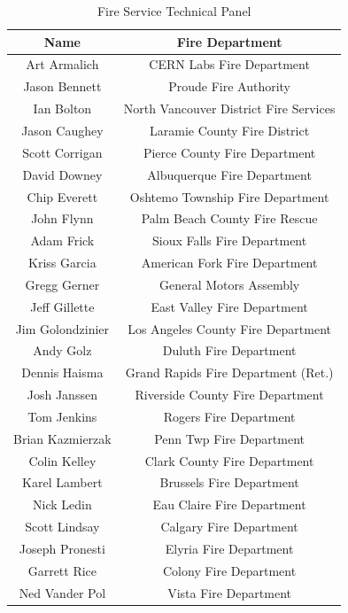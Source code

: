 \documentclass{article}
\begin{document}
\renewcommand{\arraystretch}{1.5}

\begin{table}[H]
	\centering
	\caption{Fire Service Technical Panel}
	\begin{tabular}{|c|c|}
		\hline
		\bf{Name} & \bf{Fire Department} \\ \hline \hline
		Art Armalich & CERN Labs Fire Department \\ \hline
		Jason Bennett & Proude Fire Authority \\ \hline
		Ian Bolton & North Vancouver District Fire Services \\ \hline
		Jason Caughey & Laramie County Fire District \\ \hline
		Scott Corrigan & Pierce County Fire Department \\ \hline
		David Downey & Albuquerque Fire Department \\ \hline
		Chip Everett & Oshtemo Township Fire Department \\ \hline
		John Flynn & Palm Beach County Fire Rescue \\ \hline
		Adam Frick & Sioux Falls Fire Department \\ \hline
		Kriss Garcia & American Fork Fire Department \\ \hline
		Gregg Gerner & General Motors Assembly \\ \hline
		Jeff Gillette & East Valley Fire Department \\ \hline
		Jim Golondzinier & Los Angeles County Fire Department \\ \hline
		Andy Golz & Duluth Fire Department \\ \hline
		Dennis Haisma & Grand Rapids Fire Department (Ret.) \\ \hline
		Josh Janssen & Riverside County Fire Department \\ \hline
		Tom Jenkins & Rogers Fire Department \\ \hline
		Brian Kazmierzak & Penn Twp Fire Department \\ \hline
		Colin Kelley & Clark County Fire Department \\ \hline
		Karel Lambert & Brussels Fire Department \\ \hline
		Nick Ledin & Eau Claire Fire Department \\ \hline
		Scott Lindsay & Calgary Fire Department \\ \hline
		Joseph Pronesti & Elyria Fire Department \\ \hline
		Garrett Rice & Colony Fire Department \\ \hline
		Ned Vander Pol & Vista Fire Department \\ \hline
	\end{tabular}
	\label{tab:TechPanelList}
\end{table}
\end{document}
